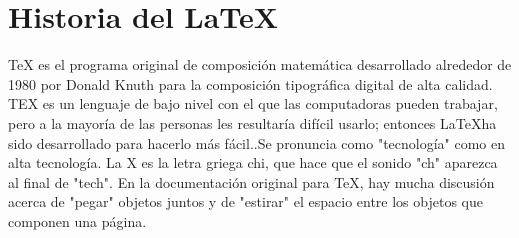 \documentclass[letterpaper, 10pt, journal]{IEEEtran}
\begin{document}
\section{Historia del \LaTeX  }
TeX es el programa original de composici\'on matem\'atica desarrollado alrededor de 1980 por Donald Knuth  para la composici\'on tipogr\'afica digital de alta calidad.\cite{[3]} TEX es un lenguaje de bajo nivel con el que las computadoras pueden trabajar, pero a la mayor\'ia de las personas les resultar\'ia dif\'icil usarlo; entonces \LaTeX   ha sido desarrollado para hacerlo m\'as f\'acil.\cite{[2]}.Se pronuncia como "tecnolog\'ia" como en alta tecnolog\'ia. La X es la letra griega chi, que hace que el sonido "ch" aparezca al final de "tech". En la documentaci\'on original para TeX, hay mucha discusi\'on acerca de "pegar" objetos juntos y de "estirar" el espacio entre los objetos que componen una p\'agina. \cite{[3]}
\end{document}
